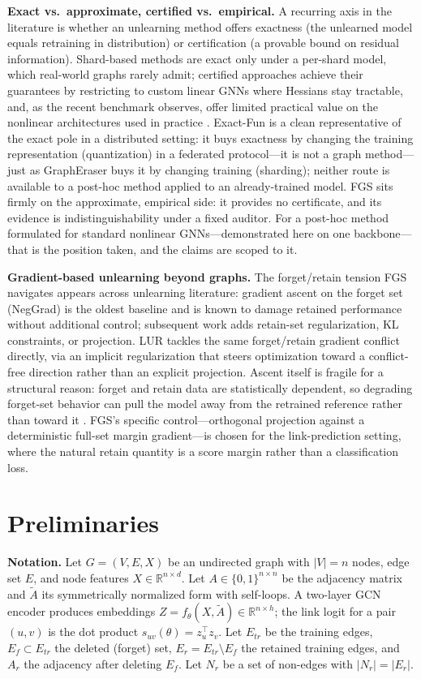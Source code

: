 \documentclass[pdflatex,sn-basic,Numbered]{sn-jnl}
\begin{document}
\textbf{Exact vs.\ approximate, certified vs.\ empirical.} A recurring axis in the literature is whether an unlearning method offers exactness (the unlearned model equals retraining in distribution) or certification (a provable bound on residual information). Shard-based methods are exact only under a per-shard model, which real-world graphs rarely admit; certified approaches achieve their guarantees by restricting to custom linear GNNs where Hessians stay tractable, and, as the recent benchmark observes, offer limited practical value on the nonlinear architectures used in practice \cite{jain2026}. Exact-Fun \cite{exactfun2023} is a clean representative of the exact pole in a distributed setting: it buys exactness by changing the training representation (quantization) in a federated protocol---it is not a graph method---just as GraphEraser buys it by changing training (sharding); neither route is available to a post-hoc method applied to an already-trained model. FGS sits firmly on the approximate, empirical side: it provides no certificate, and its evidence is indistinguishability under a fixed auditor. For a post-hoc method formulated for standard nonlinear GNNs---demonstrated here on one backbone---that is the position taken, and the claims are scoped to it.

\textbf{Gradient-based unlearning beyond graphs.} The forget/retain tension FGS navigates appears across unlearning literature: gradient ascent on the forget set (NegGrad) is the oldest baseline and is known to damage retained performance without additional control; subsequent work adds retain-set regularization, KL constraints, or projection. LUR \cite{lur2025} tackles the same forget/retain gradient conflict directly, via an implicit regularization that steers optimization toward a conflict-free direction rather than an explicit projection. Ascent itself is fragile for a structural reason: forget and retain data are statistically dependent, so degrading forget-set behavior can pull the model away from the retrained reference rather than toward it \cite{ascentfails2025}. FGS's specific control---orthogonal projection against a deterministic full-set margin gradient---is chosen for the link-prediction setting, where the natural retain quantity is a score margin rather than a classification loss.

\section{Preliminaries}
\textbf{Notation.} Let $G = (V, E, X)$ be an undirected graph with $|V| = n$ nodes, edge set $E$, and node features $X \in \mathbb{R}^{n\times d}$. Let $A \in \{0, 1\}^{n\times n}$ be the adjacency matrix and $\tilde{A}$ its symmetrically normalized form with self-loops. A two-layer GCN \cite{kipf2017} encoder produces embeddings $Z = f_\theta(X, \tilde{A}) \in \mathbb{R}^{n\times h}$; the link logit for a pair $(u, v)$ is the dot product $s_{uv}(\theta) = z_u^\top z_v$. Let $E_{tr}$ be the training edges, $E_f \subset E_{tr}$ the deleted (forget) set, $E_r = E_{tr} \setminus E_f$ the retained training edges, and $A_r$ the adjacency after deleting $E_f$. Let $N_r$ be a set of non-edges with $|N_r| = |E_r|$.
\end{document}
